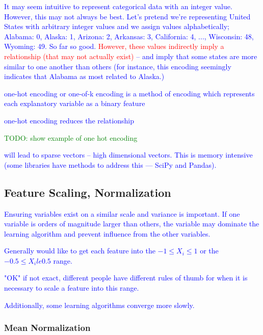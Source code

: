 \textcolor{blue}{It may seem intuitive to represent categorical data with an integer value. However, this may not always be best. Let's pretend we're representing United States with arbitrary integer values and we assign values alphabetically; Alabama: 0, Alaska: 1, Arizona: 2, Arkansas: 3, California: 4, ..., Wisconsin: 48, Wyoming: 49. So far so good. \textcolor{red}{However, these values indirectly imply a relationship (that may not actually exist)} -- and imply that some states are more similar to one another than others (for instance, this encoding seemingly indicates that Alabama as most related to Alaska.) }

\textcolor{blue}{{one-hot encoding} or one-of-k encoding is a method of encoding which represents each explanatory variable as a binary feature}

\textcolor{blue}{one-hot encoding reduces the relationship}

\textcolor{green}{TODO: show example of one hot encoding}

\textcolor{blue}{will lead to {sparse vectors} -- high dimensional vectors. This is memory intensive (some libraries have methods to address this --- SciPy and Pandas).}

\subsection{Feature Scaling, Normalization}


\textcolor{blue}{Ensuring variables exist on a similar scale and variance is important. If one variable is orders of magnitude larger than others, the variable may dominate the learning algorithm and prevent influence from the other variables.}

\textcolor{blue}{Generally would like to get each feature into the $-1 \le X_i \le 1$ or the $-0.5 \le X_i le 0.5$ range.}

\textcolor{blue}{"OK" if not exact, different people have different rules of thumb for when it is necessary to scale a feature into this range.}

\textcolor{blue}{Additionally, some learning algorithms converge more slowly.}



\subsubsection{Mean Normalization}


